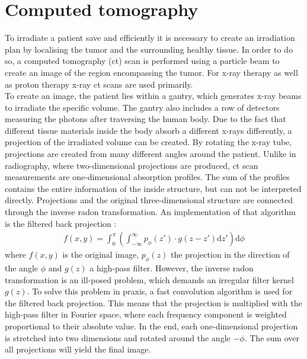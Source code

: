 \section{Computed tomography} \label{sec:ct}
To irradiate a patient save and efficiently it is necessary to create an irradiation plan by localising the tumor and the surrounding healthy tissue. In order to do so, a computed
tomography (ct) scan is performed using a particle beam to create an image of the region encompassing the tumor. For x-ray therapy as well as proton therapy x-ray ct scans
are used primarily. \\
To create an image, the patient lies within a gantry, which generates x-ray beams to irradiate the specific volume. The gantry also
includes a row of detectors measuring the photons after traversing the human body. Due to the fact that different tissue materials inside the body absorb a different
x-rays differently, a projection of the irradiated volume can be created. By rotating the x-ray tube, projections are created from many different angles around the patient.
Unlike in radiography, where two-dimensional projections are produced, ct scan measurements are one-dimensional absorption profiles. The sum of the profiles contains
the entire information of the inside structure, but can not be interpreted directly. Projections and the original three-dimensional structure are connected through
the inverse radon transformation. An implementation of that algorithm is the filtered back projection \cite{back_projection}:
\begin{align}
  f(x,y) = \int_0^{\pi} \left(\int_{-\infty}^{\infty} p_{\phi}(z') \cdot g(z - z') \mathrm{d}z'\right) \mathrm{d}\phi
\end{align}
where $f(x,y)$ is the original image, $p_{\phi}(z)$ the projection in the direction of the angle $\phi$ and $g(z)$ a high-pass filter. However, the inverse
radon transformation is an ill-posed problem, which demands an irregular filter kernel $g(z)$. To solve this problem in praxis, a fast convolution algorithm is used for the
filtered back projection. This means that the projection is multiplied with the high-pass filter in Fourier space, where each frequency component is weighted proportional to their
absolute value. In the end, each one-dimensional projection is stretched into two dimensions and rotated around the angle $-\phi$. The sum over all projections will yield the
final image.


